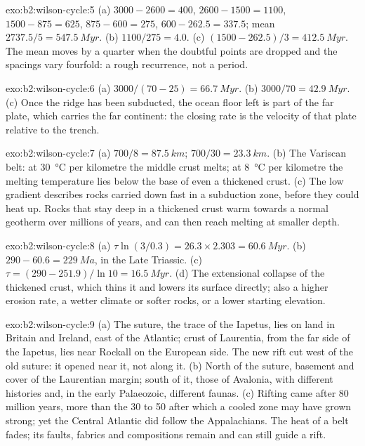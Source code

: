 \begin{solution}{exo:b2:wilson-cycle:5}
(a) $3000 - 2600 = 400$, $2600 - 1500 = 1100$, $1500 - 875 = 625$, $875 - 600 = 275$, $600 -
262.5 = 337.5$; mean $2737.5/5 = \qty{547.5}{Myr}$. (b) $1100/275 = 4.0$. (c) $(1500 -
262.5)/3 = \qty{412.5}{Myr}$. The mean moves by a quarter when the doubtful points are dropped
and the spacings vary fourfold: a rough recurrence, not a period.
\end{solution}

\begin{solution}{exo:b2:wilson-cycle:6}
(a) $3000/(70 - 25) = \qty{66.7}{Myr}$. (b) $3000/70 = \qty{42.9}{Myr}$. (c) Once the ridge has
been subducted, the ocean floor left is part of the far plate, which carries the far
continent: the closing rate is the velocity of that plate relative to the trench.
\end{solution}

\begin{solution}{exo:b2:wilson-cycle:7}
(a) $700/8 = \qty{87.5}{km}$; $700/30 = \qty{23.3}{km}$. (b) The Variscan belt: at
\qty{30}{\celsius} per kilometre the middle crust melts; at \qty{8}{\celsius} per kilometre
the melting temperature lies below the base of even a thickened crust. (c) The low gradient
describes rocks carried down fast in a subduction zone, before they could heat up. Rocks that
stay deep in a thickened crust warm towards a normal geotherm over millions of years, and can
then reach melting at smaller depth.
\end{solution}

\begin{solution}{exo:b2:wilson-cycle:8}
(a) $\tau\ln(3/0.3) = 26.3\times2.303 = \qty{60.6}{Myr}$. (b) $290 - 60.6 = \qty{229}{Ma}$, in
the Late Triassic. (c) $\tau = (290 - 251.9)/\ln10 = \qty{16.5}{Myr}$. (d) The extensional
collapse of the thickened crust, which thins it and lowers its surface directly; also a
higher erosion rate, a wetter climate or softer rocks, or a lower starting elevation.
\end{solution}

\begin{solution}{exo:b2:wilson-cycle:9}
(a) The suture, the trace of the Iapetus, lies on land in Britain and Ireland, east of the
Atlantic; crust of Laurentia, from the far side of the Iapetus, lies near Rockall on the
European side. The new rift cut west of the old suture: it opened near it, not along it.
(b) North of the suture, basement and cover of the Laurentian margin; south of it, those of
Avalonia, with different histories and, in the early Palaeozoic, different faunas. (c) Rifting
came after 80 million years, more than the 30 to 50 after which a cooled zone may have grown
strong; yet the Central Atlantic did follow the Appalachians. The heat of a belt fades; its
faults, fabrics and compositions remain and can still guide a rift.
\end{solution}

